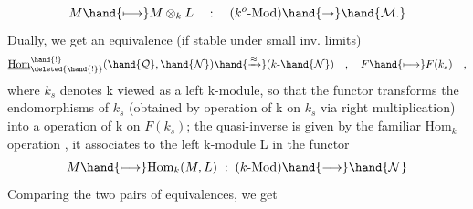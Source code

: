 \[M \hand{\longmapsto} M\otimes_{k}L \quad : \quad (k^{o}\text{-Mod})\hand{\to} \hand{\mathcal{M}.}\]
Dually, we get an equivalence (if  stable under small inv. limits)
\[\underline{\text{Hom}}^{\hand{!}}_{\deleted{\hand{!}}}(\hand{\mathcal{Q}},\hand{\mathcal{N}}) \hand{\xrightarrow{\approx}} (k\text{-}\hand{\mathcal{N}}) \quad , \quad F \hand{\longmapsto} F(k_{s}) \quad ,\]
where $k_{s}$ denotes k viewed as a left k-module, so that the \hand{\uline{\textcolor{black}{contravariant}}}
functor  transforms the endomorphisms of $k_{s}$ (obtained by \hand{\uline{\textcolor{black}{right}}} operation
of k on $k_{s}$ via right multiplication) into a \hand{\uline{\textcolor{black}{left}}} operation of k on $F(k_{s})$;
the quasi-inverse is given by the familiar $\text{Hom}_{k}$ operation , it 
associates to the left k-module L in  the functor
\[M \hand{\longmapsto} \text{Hom}_{k}(M,L) \;:\; (k\text{-Mod}) \hand{\longrightarrow} \hand{\mathcal{N}}\]
 Comparing the two pairs of equivalences, we get 
